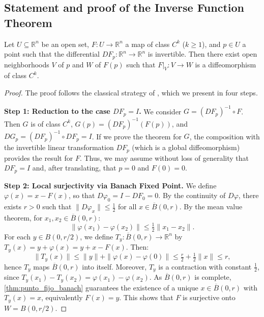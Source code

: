 \subsection{Statement and proof of the Inverse Function Theorem}

\begin{theorem}\label{thm:funcion_inversa}
Let $U \subseteq \mathbb{R}^n$ be an open set, $F: U \to \mathbb{R}^n$ a map of class $C^k$ ($k \geq 1$), and $p \in U$ a point such that the differential $DF_p: \mathbb{R}^n \to \mathbb{R}^n$ is invertible. Then there exist open neighborhoods $V$ of $p$ and $W$ of $F(p)$ such that $F|_V: V \to W$ is a diffeomorphism of class $C^k$.
\end{theorem}

\begin{proof}
The proof follows the classical strategy of \citet[Theorem~9.24]{Rudin1976}, which we present in four steps.

\textbf{Step 1: Reduction to the case $DF_p = I$.}
We consider $G = (DF_p)^{-1} \circ F$. Then $G$ is of class $C^k$, $G(p) = (DF_p)^{-1}(F(p))$, and $DG_p = (DF_p)^{-1} \circ DF_p = I$. If we prove the theorem for $G$, the composition with the invertible linear transformation $DF_p$ (which is a global diffeomorphism) provides the result for $F$. Thus, we may assume without loss of generality that $DF_p = I$ and, after translating, that $p = 0$ and $F(0) = 0$.

\textbf{Step 2: Local surjectivity via Banach Fixed Point.}
We define $\varphi(x) = x - F(x)$, so that $D\varphi_0 = I - DF_0 = 0$. By the continuity of $D\varphi$, there exists $r > 0$ such that $\|D\varphi_x\| \leq \tfrac{1}{2}$ for all $x \in \overline{B}(0, r)$. By the mean value theorem, for $x_1, x_2 \in \overline{B}(0, r)$:
\[
\|\varphi(x_1) - \varphi(x_2)\| \leq \tfrac{1}{2} \|x_1 - x_2\|.
\]
For each $y \in B(0, r/2)$, we define $T_y: \overline{B}(0, r) \to \mathbb{R}^n$ by $T_y(x) = y + \varphi(x) = y + x - F(x)$. Then:
\[
\|T_y(x)\| \leq \|y\| + \|\varphi(x) - \varphi(0)\| \leq \tfrac{r}{2} + \tfrac{1}{2}\|x\| \leq r,
\]
hence $T_y$ maps $\overline{B}(0, r)$ into itself. Moreover, $T_y$ is a contraction with constant $\tfrac{1}{2}$, since $T_y(x_1) - T_y(x_2) = \varphi(x_1) - \varphi(x_2)$. As $\overline{B}(0, r)$ is complete, \autoref{thm:punto_fijo_banach} guarantees the existence of a unique $x \in \overline{B}(0, r)$ with $T_y(x) = x$, equivalently $F(x) = y$. This shows that $F$ is surjective onto $W = B(0, r/2)$.


\end{proof}
